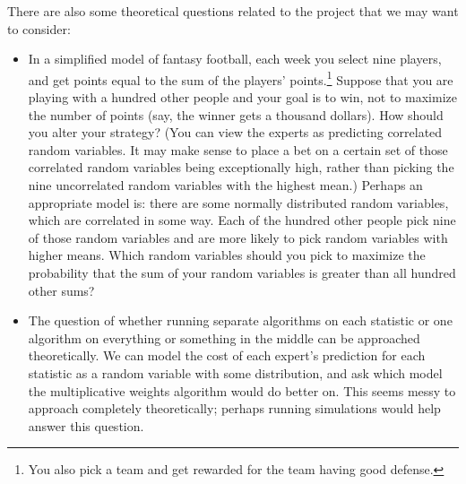 \documentclass{article}
\begin{document}
There are also some theoretical questions related to the project that we may want to consider:
\begin{itemize}
    \item In a simplified model of fantasy football, each week you select nine players, and get points equal to the sum of the players' points.\footnote{You also pick a team and get rewarded for the team having good defense.} Suppose that you are playing with a hundred other people and your goal is to win, not to maximize the number of points (say, the winner gets a thousand dollars). How should you alter your strategy? (You can view the experts as predicting correlated random variables. It may make sense to place a bet on a certain set of those correlated random variables being exceptionally high, rather than picking the nine uncorrelated random variables with the highest mean.) Perhaps an appropriate model is: there are some normally distributed random variables, which are correlated in some way. Each of the hundred other people pick nine of those random variables and are more likely to pick random variables with higher means. Which random variables should you pick to maximize the probability that the sum of your random variables is greater than all hundred other sums?
    \item The question of whether running separate algorithms on each statistic or one algorithm on everything or something in the middle can be approached theoretically. We can model the cost of each expert's prediction for each statistic as a random variable with some distribution, and ask which model the multiplicative weights algorithm would do better on. This seems messy to approach completely theoretically; perhaps running simulations would help answer this question.
\end{itemize}
\end{document}
